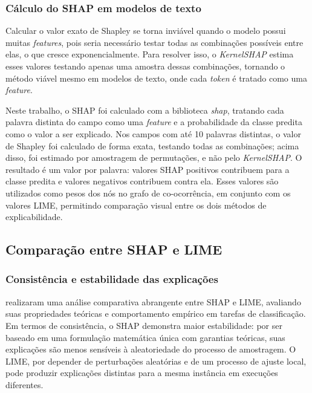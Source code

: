 \documentclass[
    12pt,                %
    openright,           %
    oneside,             %
    a4paper,             %
    english,             %
    brazil               %
]{abntex2}
\begin{document}
\subsubsection{Cálculo do SHAP em modelos de texto}
\label{subsubsec:shap_kernel}

Calcular o valor exato de Shapley se torna inviável quando o modelo 
possui muitas \textit{features}, pois seria necessário testar todas 
as combinações possíveis entre elas, o que cresce exponencialmente. 
Para resolver isso, o \textit{KernelSHAP} \cite{lundberg2017} estima 
esses valores testando apenas uma amostra dessas combinações, tornando 
o método viável mesmo em modelos de texto, onde cada \textit{token} 
é tratado como uma \textit{feature}.

Neste trabalho, o SHAP foi calculado com a biblioteca \textit{shap}, tratando cada palavra distinta do campo como uma \textit{feature} e a probabilidade da classe predita como o valor a ser explicado. Nos campos com até 10 palavras distintas, o valor de Shapley foi calculado de forma exata, testando todas as combinações; acima disso, foi estimado por amostragem de permutações, e não pelo \textit{KernelSHAP}. O resultado é um valor por palavra: valores SHAP positivos contribuem para a classe predita e valores negativos contribuem contra ela. Esses valores são utilizados como pesos dos nós no grafo de co-ocorrência, em conjunto com os valores LIME, permitindo comparação visual entre os dois métodos de explicabilidade.

\subsection{Comparação entre SHAP e LIME}
\label{subsec:shap_lime}

\subsubsection{Consistência e estabilidade das explicações}
\label{subsubsec:comparacao_consistencia}

 realizaram uma análise comparativa abrangente entre SHAP e LIME, avaliando suas propriedades teóricas e comportamento empírico em tarefas de classificação. Em termos de consistência, o SHAP demonstra maior estabilidade: por ser baseado em uma formulação matemática única com garantias teóricas, suas explicações são menos sensíveis à aleatoriedade do processo de amostragem. O LIME, por depender de perturbações aleatórias e de um processo de ajuste local, pode produzir explicações distintas para a mesma instância em execuções diferentes.
\end{document}

